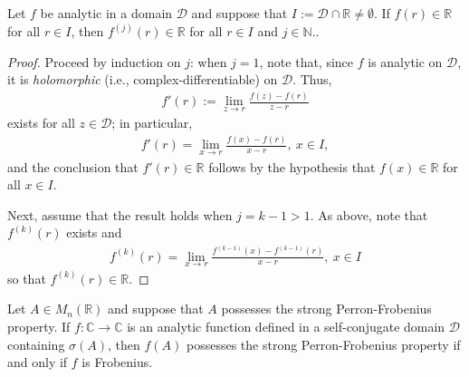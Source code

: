 \documentclass[10pt,twoside,leqno]{siamltex}
\begin{document}
\begin{lemma} \label{lem:analytic}
Let $f$ be analytic in a domain $\mathcal{D}$ and suppose that $I := \mathcal{D} \cap {\mathbb{{R}}} \neq \emptyset$. If $f(r) \in {\mathbb{{R}}}$ for all $r \in I$, then $f^{(j)}(r) \in {\mathbb{{R}}}$ for all $r \in I$ and $j \in {\mathbb{{N}}}$..
\end{lemma}

\begin{proof}
Proceed by induction on $j$: when $j=1$, note that, since $f$ is analytic on $\mathcal{D}$, it is \textit{holomorphic} (i.e., complex-differentiable) on $\mathcal{D}$. Thus,   
\begin{align*}
f'(r) := \lim_{z \rightarrow r} \frac{f(z) - f(r)}{z-r}
\end{align*}
exists for all $z \in \mathcal{D}$; in particular, 
\begin{align*}
f'(r) = \lim_{x \rightarrow r} \frac{f(x) - f(r)}{x - r},~x \in I, 
\end{align*}
and the conclusion that $f'(r) \in {\mathbb{{R}}}$ follows by the hypothesis that $f(x) \in {\mathbb{{R}}}$ for all $x \in I$.

Next, assume that the result holds when $j=k-1>1$. As above, note that $f^{(k)}(r)$ exists and 
 \begin{align*}
f^{(k)}(r) = \lim_{x \rightarrow r} \frac{f^{(k-1)}(x) - f^{(k-1)}(r)}{x - r},~x \in I 
\end{align*}
so that $f^{(k)}(r) \in {\mathbb{{R}}}$.
\end{proof}

\begin{theorem} \label{thm:mainresult}
Let $A \in {M_{{n}}({{\mathbb{{R}}}})}$ and suppose that $A$ possesses the strong Perron-Frobenius property. If $f: {\mathbb{{C}}} \longrightarrow {\mathbb{{C}}}$ is an analytic function defined in a self-conjugate domain $\mathcal{D}$ containing ${\sigma \left( {A} \right)}$, then $f(A)$ possesses the strong Perron-Frobenius property if and only if $f$ is Frobenius.
\end{theorem}
\end{document}
